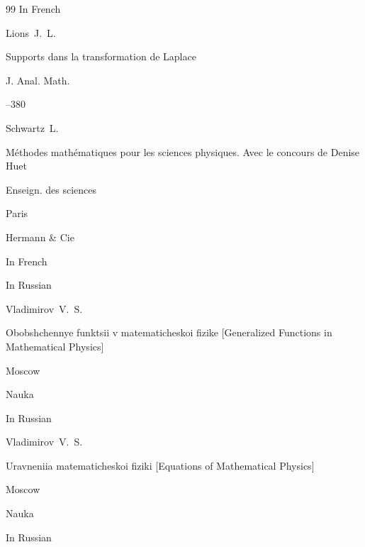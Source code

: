 \begin{thebibliography}{99}
\lang In French

\by Lions~J.~L.

\paper Supports dans la transformation de Laplace

\jour J. Anal. Math. 


--380 






\by Schwartz~L.

\book M\'ethodes math\'ematiques pour les sciences physiques. Avec le concours de Denise Huet

\serial Enseign. des sciences

\publaddr Paris

\publ Hermann \& Cie



\lang In French






\lang In Russian

\by Vladimirov~V.~S.

\book Obobshchennye funktsii v matematicheskoi fizike \rm [Generalized Functions in Mathematical Physics]

\publaddr Moscow

\publ Nauka








\lang In Russian

\by Vladimirov~V.~S.

\book Uravneniia matematicheskoi fiziki \rm [Equations of Mathematical Physics]

\publaddr Moscow

\publ Nauka








\lang In Russian


\end{thebibliography}
